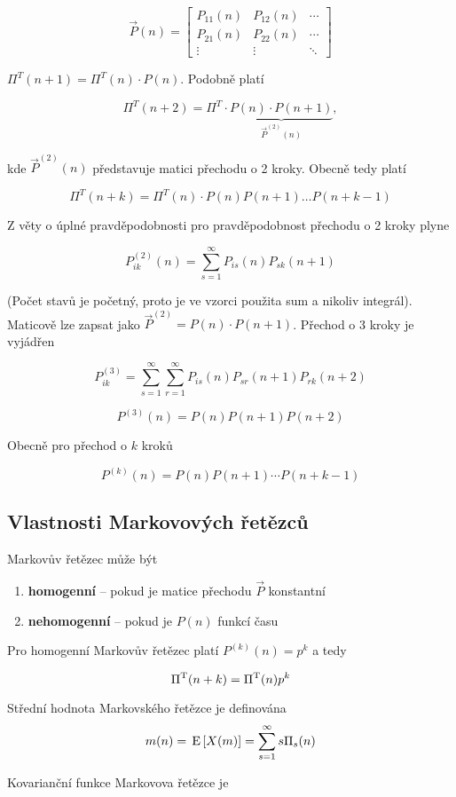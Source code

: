 \[ \vec{P}(n) =
\begin{bmatrix}
P_{11}(n) & P_{12}(n) & \cdots\\
P_{21}(n) & P_{22}(n) & \cdots\\
\vdots & \vdots & \ddots
\end{bmatrix} \]

$\Pi^T(n+1)= \Pi^T(n)\cdot P(n)$. Podobně platí

\[ \Pi^T(n+2)=\Pi^T\cdot \underbrace{P(n)\cdot P(n+1)}_{\vec{P}^{(2)}(n)}, \]

kde $\vec{P}^{(2)}(n)$ představuje matici přechodu o 2 kroky. Obecně tedy platí

\[ \Pi^T(n+k)=\Pi^T(n)\cdot P(n)P(n+1)\ldots P(n+k-1) \]

Z věty o úplné pravděpodobnosti pro pravděpodobnost přechodu o 2 kroky plyne

\[ P_{ik}^{(2)}(n) = \sum_{s=1}^\infty P_{is}(n)P_{sk}(n+1) \]

(Počet stavů je početný, proto je ve vzorci použita sum a nikoliv integrál). Maticově lze zapsat jako $\vec{P}^{(2)}=P(n)\cdot P(n+1)$. Přechod o 3 kroky je vyjádřen

\[ P_{ik}^{(3)} = \sum_{s=1}^\infty \sum_{r=1}^\infty P_{is}(n)P_{sr}(n+1)P_{rk}(n+2) \]

\[ P^{(3)}(n)=P(n)P(n+1)P(n+2) \]

Obecně pro přechod o $k$ kroků

\[ P^{(k)}(n)=P(n)P(n+1)\cdots P(n+k-1) \]

\subsection{Vlastnosti Markovových řetězců}
Markovův řetězec může být

\begin{enumerate}[noitemsep]
\item \textbf{homogenní} -- pokud je matice přechodu $\vec{P}$ konstantní
\item \textbf{nehomogenní} -- pokud je $P(n)$ funkcí času
\end{enumerate}

Pro homogenní Markovův řetězec platí $P^{(k)}(n)=p^k$ a tedy

\[ \Pi^{\mathrm{T}}(n+k) = \Pi^{\mathrm{T}}(n)p^k \]

Střední hodnota Markovského řetězce je definována
\[ m(n) = \,\mathrm{E}\left[X(m)\right]=\sum_{s=1}^\infty s\Pi_s(n) \]

Kovarianční funkce Markovova řetězce je

